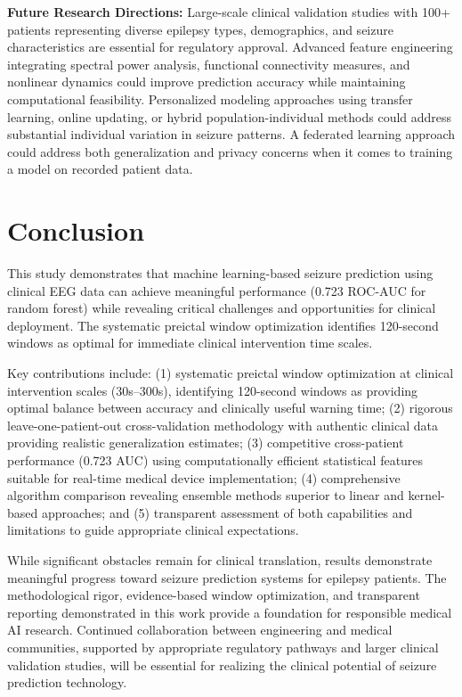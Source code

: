 \documentclass[conference]{IEEEtran}
\begin{document}
\textbf{Future Research Directions:} Large-scale clinical validation studies with 100+ patients representing diverse epilepsy types, demographics, and seizure characteristics are essential for regulatory approval. Advanced feature engineering integrating spectral power analysis, functional connectivity measures, and nonlinear dynamics could improve prediction accuracy while maintaining computational feasibility. Personalized modeling approaches using transfer learning, online updating, or hybrid population-individual methods could address substantial individual variation in seizure patterns. A federated learning approach could address both generalization and privacy concerns when it comes to training a model on recorded patient data.

\section{Conclusion}
This study demonstrates that machine learning-based seizure prediction using clinical EEG data can achieve meaningful performance (0.723 ROC-AUC for random forest) while revealing critical challenges and opportunities for clinical deployment. The systematic preictal window optimization identifies 120-second windows as optimal for immediate clinical intervention time scales.

Key contributions include: (1) systematic preictal window optimization at clinical intervention scales (30s--300s), identifying 120-second windows as providing optimal balance between accuracy and clinically useful warning time; (2) rigorous leave-one-patient-out cross-validation methodology with authentic clinical data providing realistic generalization estimates; (3) competitive cross-patient performance (0.723 AUC) using computationally efficient statistical features suitable for real-time medical device implementation; (4) comprehensive algorithm comparison revealing ensemble methods superior to linear and kernel-based approaches; and (5) transparent assessment of both capabilities and limitations to guide appropriate clinical expectations.

While significant obstacles remain for clinical translation, results demonstrate meaningful progress toward seizure prediction systems for epilepsy patients. The methodological rigor, evidence-based window optimization, and transparent reporting demonstrated in this work provide a foundation for responsible medical AI research. Continued collaboration between engineering and medical communities, supported by appropriate regulatory pathways and larger clinical validation studies, will be essential for realizing the clinical potential of seizure prediction technology.
\end{document}
